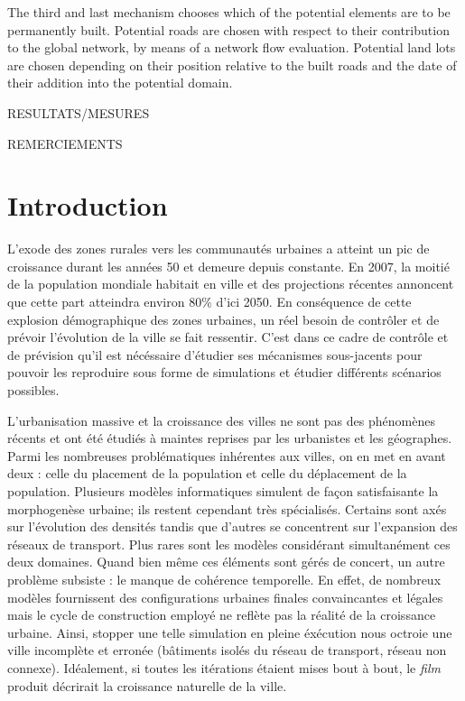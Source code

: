\documentclass[10pt]{article}
\begin{document}
The third and last mechanism chooses which of the potential elements
are to be permanently built. Potential roads are chosen with respect
to their contribution to the global network, by means of a network
flow evaluation. Potential land lots are chosen depending on their
position relative to the built roads and the date of their addition
into the potential domain.

RESULTATS/MESURES

\newpage

\tableofcontents

\newpage

REMERCIEMENTS

\newpage

\section{Introduction}

L'exode des zones rurales vers les communautés urbaines a atteint un
pic de croissance durant les années 50 et demeure depuis constante. En
2007, la moitié de la population mondiale habitait en ville et des
projections récentes annoncent que cette part atteindra environ 80\%
d'ici 2050. En conséquence de cette explosion démographique des zones
urbaines, un réel besoin de contrôler et de prévoir l'évolution de la
ville se fait ressentir. C'est dans ce cadre de contrôle et de
prévision qu'il est nécéssaire d'étudier ses mécanismes sous-jacents
pour pouvoir les reproduire sous forme de simulations et étudier
différents scénarios possibles.

L'urbanisation massive et la croissance des villes ne sont pas des
phénomènes récents et ont été étudiés à maintes reprises par les
urbanistes et les géographes. Parmi les nombreuses problématiques
inhérentes aux villes, on en met en avant deux : celle du placement de
la population et celle du déplacement de la population. Plusieurs
modèles informatiques simulent de façon satisfaisante la morphogenèse
urbaine; ils restent cependant très spécialisés. Certains sont axés
sur l'évolution des densités tandis que d'autres se concentrent sur
l'expansion des réseaux de transport. Plus rares sont les modèles
considérant simultanément ces deux domaines. Quand bien même ces
éléments sont gérés de concert, un autre problème subsiste : le manque
de cohérence temporelle. En effet, de nombreux modèles fournissent des
configurations urbaines finales convaincantes et légales mais le cycle
de construction employé ne reflète pas la réalité de la croissance
urbaine. Ainsi, stopper une telle simulation en pleine éxécution nous
octroie une ville incomplète et erronée (bâtiments isolés du réseau de
transport, réseau non connexe). Idéalement, si toutes les itérations
étaient mises bout à bout, le \textit{film} produit décrirait la
croissance naturelle de la ville.
\end{document}
